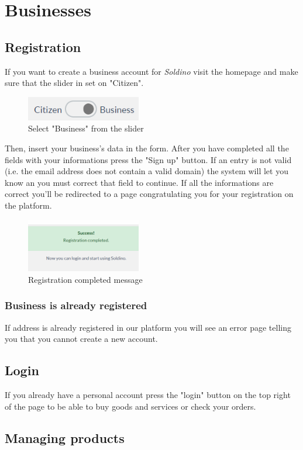 \section{Businesses}
	\subsection{Registration}
	If you want to create a business account for \textit{Soldino} 
	visit the homepage and make sure that the slider in set on "Citizen".\\
	\begin{figure}[H]
		\includegraphics[width=5cm]{res/images/user_business.png}
		\centering
		\caption{Select "Business" from the slider}
	\end{figure}	
	Then, insert your business's data in the form. After you have completed 
	all the	fields with your informations press the "Sign up" button. If an 
	entry is not valid (i.e. the email address does not contain a valid 
	domain) the system will let you know an you must correct that field 
	to continue. If all the informations are correct you'll be redirected 
	to a page congratulating you for your registration on the platform.
	\begin{figure}[H]
		\includegraphics[width=5cm]{res/images/registration_complete.png}
		\centering
		\caption{Registration completed message}
	\end{figure}
	\subsubsection{Business is already registered}
	If  address is already registered in our platform you will see an
	error page telling you that you cannot create a new account.
	\subsection{Login}
	If you already have a personal account press the "login" button on the 
	top right of the page to be able to buy goods and services or check your
	orders.
	\subsection{Managing products}
